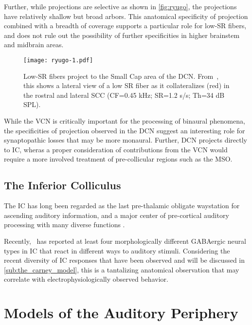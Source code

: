 Further, while projections are selective as shown in \autoref{fig:ryugo}, the projections have relatively shallow but broad arbors. This anatomical specificity of projection combined with a breadth of coverage supports a particular role for low-SR fibers, and does not rule out the possibility of further specificities in higher brainstem and midbrain areas. 

\begin{figure}[htbp]
	\centering
	\texttt{[image: ryugo-1.pdf]}
	\caption[Low SR Fibers Project to the Small Cap]{Low-SR fibers project to the Small Cap area of the DCN.  From~\cite{Ryugo2008Projections}, this shows a lateral view of a low SR fiber as it collateralizes (red) in the rostral and lateral SCC (CF=0.45 kHz; SR=1.2 s/s; Th=34 dB SPL).}
	\label{fig:ryugo}
\end{figure}

While the VCN is critically important for the processing of binaural phenomena, the specificities of projection observed in the DCN suggest an interesting role for synaptopathic losses that may be more monaural.  Further, DCN projects directly to IC, wheras a proper consideration of contributions from the VCN would require a more involved treatment of pre-collicular regions such as the MSO. 
\subsection{The Inferior Colliculus} %
\label{sub:the_inferior_colliculus}
The IC has long been regarded as the last pre-thalamic obligate waystation for ascending auditory information, and a major center of pre-cortical auditory processing with many diverse functions \citep{Cant2005Atlas,Covey2008Inputs,Moore1985Projections}.

Recently,~\cite{Beebe2016Extracellular} has reported at least four morphologically different GABAergic neural types in IC that react in different ways to auditory stimuli.  Considering the recent diversity of IC responses that have been observed and will be discussed in \autoref{sub:the_carney_model}, this is a tantalizing anatomical observation that may correlate with electrophysiologically observed behavior.  



\section{Models of the Auditory Periphery} %
\label{sec:models_of_the_auditory_periphery}
